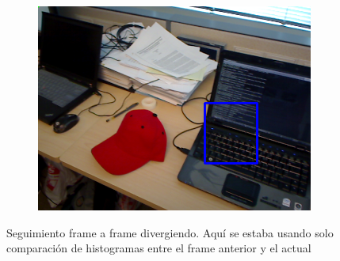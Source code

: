 \begin{figure}
\begin{subfigure}[b]{0.3\textwidth}
		\includegraphics[width=\textwidth]{img/seguimiento_solo_frame/solo_frame-desk_1-coffee_mug_5-frame_34.png}
	\end{subfigure}

	\caption{Seguimiento frame a frame divergiendo. Aquí se estaba usando solo comparación de histogramas entre el frame anterior y el actual}
	\label{frame_only_tracking}
\end{figure}


